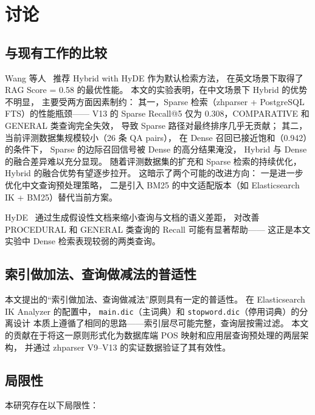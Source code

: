 \documentclass[a4paper, 12pt]{ctexart}
\begin{document}
\section{讨论}

\subsection{与现有工作的比较}

Wang 等人~\cite{wang2024rag_bpractices} 推荐 Hybrid with HyDE 作为默认检索方法，
在英文场景下取得了 RAG Score = 0.58 的最优性能。
本文的实验表明，在中文场景下 Hybrid 的优势不明显，
主要受两方面因素制约：
其一，Sparse 检索（zhparser + PostgreSQL FTS）的性能瓶颈——
V13 的 Sparse Recall@5 仅为 0.308，COMPARATIVE 和 GENERAL 类查询完全失效，
导致 Sparse 路径对最终排序几乎无贡献；
其二，当前评测数据集规模较小（26 条 QA pairs），
在 Dense 召回已接近饱和（0.942）的条件下，
Sparse 的边际召回信号被 Dense 的高分结果淹没，
Hybrid 与 Dense 的融合差异难以充分显现。
随着评测数据集的扩充和 Sparse 检索的持续优化，
Hybrid 的融合优势有望逐步拉开。
这暗示了两个可能的改进方向：
一是进一步优化中文查询预处理策略，
二是引入 BM25 的中文适配版本（如 Elasticsearch IK + BM25）替代当前方案。

HyDE~\cite{gao2022hyde} 通过生成假设性文档来缩小查询与文档的语义差距，
对改善 PROCEDURAL 和 GENERAL 类查询的 Recall 可能有显著帮助——
这正是本文实验中 Dense 检索表现较弱的两类查询。

\subsection{索引做加法、查询做减法的普适性}

本文提出的``索引做加法、查询做减法''原则具有一定的普适性。
在 Elasticsearch IK Analyzer 的配置中，
\texttt{main.dic}（主词典）和 \texttt{stopword.dic}（停用词典）的分离设计
本质上遵循了相同的思路——索引层尽可能完整，查询层按需过滤。
本文的贡献在于将这一原则形式化为数据库端 POS 映射和应用层查询预处理的两层架构，
并通过 zhparser V9--V13 的实证数据验证了其有效性。

\subsection{局限性}

本研究存在以下局限性：
\end{document}
